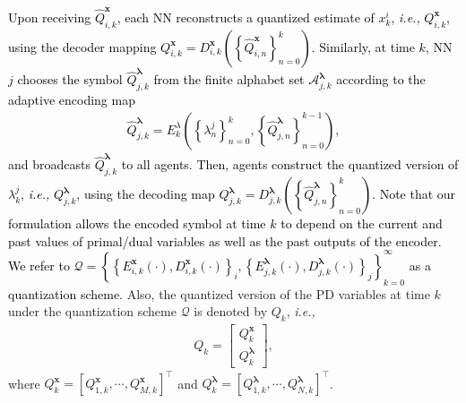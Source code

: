 \documentclass[10pt,twocolumn,twoside]{IEEEtran}
\begin{document}
 \textcolor{black}{Upon receiving $\hat{Q}^{{\ensuremath{\boldsymbol{{x}}}}}_{i,k}$, each NN reconstructs a  quantized estimate of $x^i_k$, \emph{i.e.,} ${\ensuremath{Q^{{{\ensuremath{\boldsymbol{{x}}}}}}_{{i,k}}}}$, 
using the decoder mapping ${\ensuremath{Q^{{{\ensuremath{\boldsymbol{{x}}}}}}_{{i,k}}}}=D^{{\ensuremath{\boldsymbol{{x}}}}}_{i,k}{\left({\left\{\hat{Q}^{{\ensuremath{\boldsymbol{{x}}}}}_{i,n}\right\}_{n=0}^k}\right)}$.
}
\textcolor{black}{Similarly, at time $k$, NN $j$ chooses the symbol $\hat{Q}^{{\ensuremath{\boldsymbol{{\lambda}}}}}_{j,k}$ from the finite alphabet set $\mathcal{A}^{{\ensuremath{\boldsymbol{{\lambda}}}}}_{j,k}$ according to the adaptive encoding map 
\begin{eqnarray}\hat{Q}^{{\ensuremath{\boldsymbol{{\lambda}}}}}_{j,k}=E_k^{\lambda}{\left({\left\{\lambda^j_n\right\}_{n=0}^k,\left\{\hat{Q}^{{\ensuremath{\boldsymbol{{\lambda}}}}}_{j,n}\right\}_{n=0}^{k-1}}\right)},\nonumber
\end{eqnarray}
 and broadcasts $\hat{Q}^{{\ensuremath{\boldsymbol{{\lambda}}}}}_{j,k}$ to all agents. Then, agents construct the quantized version of $\lambda^j_{k}$, \emph{i.e.,} ${\ensuremath{Q^{{{\ensuremath{\boldsymbol{{\lambda}}}}}}_{{j,k}}}}$, using the decoding map ${\ensuremath{Q^{{{\ensuremath{\boldsymbol{{\lambda}}}}}}_{{j,k}}}}=D^{{\ensuremath{\boldsymbol{{\lambda}}}}}_{j,k}{\left({\left\{\hat{Q}^{{\ensuremath{\boldsymbol{{\lambda}}}}}_{j,n}\right\}_{n=0}^k}\right)}$. Note that our formulation allows the encoded symbol at time $k$ to depend on the current and past values of primal/dual variables as well as the past outputs of the encoder.}
 \textcolor{black}{We refer to $\mathcal{Q}=\!\!\left\{\!\!\left\{\!E^{{\ensuremath{\boldsymbol{{x}}}}}_{i,k}{\left({\cdot}\right)}\!,\!D^{{\ensuremath{\boldsymbol{{x}}}}}_{i,k}{\left({\cdot}\right)}\!\right\}_i\!,\!\left\{\!E^{{\ensuremath{\boldsymbol{{\lambda}}}}}_{j,k}{\left({\cdot}\right)}\!, \!D^{{\ensuremath{\boldsymbol{{\lambda}}}}}_{j,k}{\left({\cdot}\right)}\!\right\}_j\!\!\right\}_{k=0}^\infty$ as a quantization scheme.}
Also, the quantized version of the PD variables at time $k$ under the quantization scheme $\mathcal{Q}$ is denoted by ${\ensuremath{Q^{{}}_{{k}}}}$, \emph{i.e.,}
\begin{eqnarray}
{\ensuremath{Q^{{}}_{{k}}}}=
\left[
\begin{array}{c}
{\ensuremath{Q^{{{\ensuremath{\boldsymbol{{x}}}}}}_{{k}}}}\\
{\ensuremath{Q^{{{\ensuremath{\boldsymbol{{\lambda}}}}}}_{{k}}}}\nonumber
\end{array}
\right],
\end{eqnarray}
where ${\ensuremath{Q^{{{\ensuremath{\boldsymbol{{x}}}}}}_{{k}}}}\!\!=\!\!\left[{\ensuremath{Q^{{{\ensuremath{\boldsymbol{{x}}}}}}_{{1,k}}}},\cdots,{\ensuremath{Q^{{{\ensuremath{\boldsymbol{{x}}}}}}_{{M,k}}}}\right]^\top$ and ${\ensuremath{Q^{{{\ensuremath{\boldsymbol{{\lambda}}}}}}_{{k}}}}\!\!=\!\!\left[{\ensuremath{Q^{{{\ensuremath{\boldsymbol{{\lambda}}}}}}_{{1,k}}}},\cdots,{\ensuremath{Q^{{{\ensuremath{\boldsymbol{{\lambda}}}}}}_{{N,k}}}}\right]^\top$. 
\end{document}
